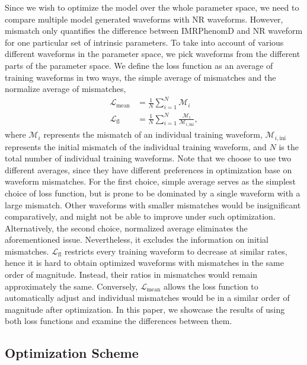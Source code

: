 \documentclass[twocolumn]{aastex631}
\begin{document}
Since we wish to optimize the model over the whole parameter space, we need to compare multiple model generated waveforms with NR waveforms. However, mismatch only quantifies the difference between IMRPhenomD and NR waveform for one particular set of intrinsic parameters. To take into account of various different waveforms in the parameter space, we pick waveforms from the different parts of the parameter space. We define the loss function as an average of training waveforms in two ways, the simple average of mismatches and the normalize average of mismatches,  
\begin{align}
	\mathcal{L}_{\mathrm{mean}}&=\frac{1}{N}\sum_{i=1}^N\mathcal{M}_i \\
	\mathcal{L}_{\mathrm{fl}}&=\frac{1}{N}\sum_{i=1}^N\frac{\mathcal{M}_i}{\mathcal{M}_{i,\mathrm{ini}}},
\end{align}	
where $\mathcal{M}_i$ represents the mismatch of an individual training waveform,
$\mathcal{M}_{i,\mathrm{ini}}$ represents the initial mismatch of the individual
training waveform, and $N$ is the total number of individual training waveforms.
Note that we choose to use two different averages, since they have different 
preferences in optimization base on waveform mismatches. For the first choice, 
simple average serves as the simplest choice of loss function, but is prone to 
be dominated by a single waveform with a large mismatch. Other waveforms with 
smaller mismatches would be insignificant comparatively, and might not be able 
to improve under such optimization. Alternatively, the second choice, normalized 
average eliminates the aforementioned issue. Nevertheless, it excludes the
information on initial mismatches. $\mathcal{L}_{\mathrm{fl}}$ restricts every
training waveform to decrease at similar rates, hence it is hard to obtain
optimized waveforms with mismatches in the same order of magnitude. Instead,
their ratios in mismatches would remain approximately the same. Conversely,
$\mathcal{L}_{\mathrm{mean}}$ allows the loss function to automatically adjust
and individual mismatches would be in a similar order of magnitude after 
optimization. In this paper, we showcase the results of using both loss functions 
and examine the differences between them. 

\subsection{Optimization Scheme} \label{subsec:optimization}
\end{document}
